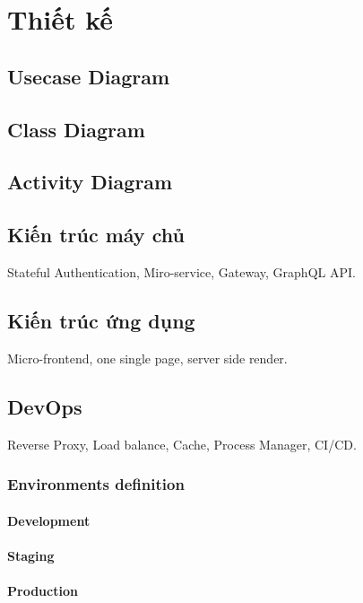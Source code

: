 \documentclass{report}
\begin{document}
\chapter{Thiết kế}
\section{Usecase Diagram}
\section{Class Diagram}
\section{Activity Diagram}
\section{Kiến trúc máy chủ}
Stateful Authentication, Miro-service, Gateway, GraphQL API.
\section{Kiến trúc ứng dụng}
Micro-frontend, one single page, server side render.
\section{DevOps}
Reverse Proxy, Load balance, Cache, Process Manager, CI/CD.
\subsection{Environments definition}
\subsubsection{Development}
\subsubsection{Staging}
\subsubsection{Production}
\end{document}
